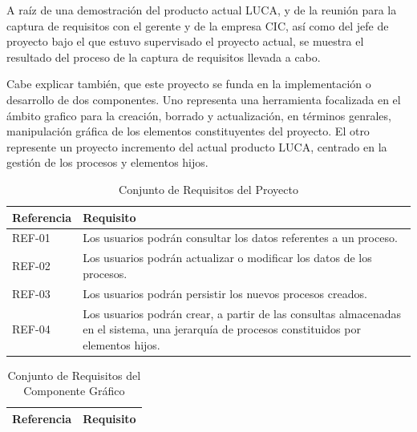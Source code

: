 \documentclass[a4paper,12pt]{book}
\begin{document}
		A raíz de una demostración del producto actual LUCA, y de la reunión para la captura de requisitos con el gerente y de la empresa CIC, así como del jefe de proyecto bajo el que estuvo supervisado el proyecto actual, se muestra el resultado del proceso de la captura de requisitos llevada a cabo. 
		
		\vspace{5mm}
		
		Cabe explicar también, que este proyecto se funda en la implementación o desarrollo de dos componentes. Uno  representa una herramienta focalizada en el ámbito grafico para la creación, borrado y actualización, en términos genrales, manipulación gráfica de los elementos constituyentes del proyecto. El otro represente un proyecto incremento del actual producto LUCA, centrado en la gestión de los procesos y elementos hijos.
		
		
		\begin{table}[htbp]
			\begin{center}
				\begin{tabular}{|l|l|}
					\hline
					Referencia & Requisito \\
					\hline \hline
					REF-01 & Los usuarios podrán consultar los datos referentes a un proceso. \\ \hline
					REF-02 & Los usuarios podrán actualizar o modificar los datos de los procesos. \\ \hline
					REF-03 & Los usuarios podrán persistir los nuevos procesos creados. \\ \hline
					REF-04 & Los usuarios podrán crear, a partir de las consultas almacenadas en el sistema, una jerarquía de procesos constituidos por elementos hijos. \\ \hline
				\end{tabular}
				\caption{Conjunto de Requisitos del Proyecto}
				\label{tabla:requisitosProceso}
			\end{center}
		\end{table}
	
	
		\begin{table}[htbp]
			\begin{center}
				\begin{tabular}{|l|l|}
					\hline
					Referencia & Requisito \\
					\hline \hline

				\end{tabular}
				\caption{Conjunto de Requisitos del Componente Gráfico}
				\label{tabla:requisitosHerramientaProceso}
			\end{center}
		\end{table}
	
\end{document}
